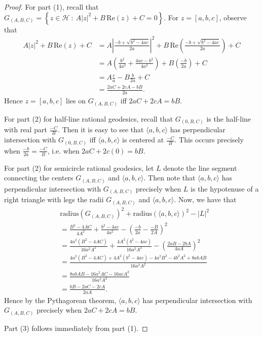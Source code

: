 \documentclass[11pt,letterpaper,reqno]{amsart}
\numberwithin{equation}{section}
\numberwithin{figure}{section}
\numberwithin{table}{section}
\newcommand{\lrp}[1]{\left(#1\right)}
\newcommand{\lrcb}[1]{\left\{#1\right\}}
\newcommand{\HH}{\mathcal{H}}
\begin{document}
\begin{proof} For part (1), recall that $G_{(A,B,C)} = \lrcb{z \in \HH ~:~ A|z|^2 + B\,\mathrm{Re}(z) + C = 0}$. For $z = [a,b,c]$, observe that
\begin{align}
    A|z|^2 + B\,\mathrm{Re}(z) + C 
    &= A\left| \frac{-b+\sqrt{b^2-4ac}}{2a}\right|^2 + B\,\mathrm{Re}\!\lrp{\frac{-b+\sqrt{b^2-4ac}}{2a}} +C \\
    &= A\lrp{ \frac{b^2}{4a^2} + \frac{4ac-b^2}{4a^2}} + B\lrp{\frac{-b}{2a}} +C \\
    &= A \frac{c}{a} - B \frac{b}{2a} + C \\
    &= \frac{2aC + 2cA - bB}{2a}.
\end{align}
Hence $z = [a,b,c]$ lies on $G_{(A,B,C)}$ iff $2aC + 2cA = bB$.

For part (2) for half-line rational geodesics, recall that $G_{(0,B,C)}$ is the half-line with real part $\frac{-C}{B}$. Then it is easy to see that $\langle a,b,c \rangle$ has perpendicular intersection with $G_{(0,B,C)}$ iff $\langle a,b,c \rangle$ is centered at $\frac{-C}{B}$. This occurs precisely when $\frac{-b}{2a} = \frac{-C}{B}$, i.e. when $2aC + 2c(0) = bB$.


For part (2) for semicircle rational geodesics, let $L$ denote the line segment connecting the centers $G_{(A,B,C)}$ and $\langle a,b,c \rangle$. Then note that $\langle a,b,c \rangle$ has perpendicular intersection with $G_{(A,B,C)}$ precisely when $L$ is the hypotenuse of a right triangle with legs the radii $G_{(A,B,C)}$ and $\langle a,b,c \rangle$. Now, we have that
\begin{align}
    &\text{radius}(G_{(A,B,C)})^2 + \text{radius}(\langle a,b,c \rangle)^2 -  |L|^2  \\
    &= \frac{B^2-4AC}{4A^2} + \frac{b^2-4ac}{4a^2} - \lrp{\frac{-b}{2a} - \frac{-B}{2A}}^2 \\
    &= \frac{4a^2 (B^2-4AC)}{16a^2A^2} + \frac{4A^2 (b^2-4ac)}{16a^2A^2} - \lrp{\frac{2aB-2bA}{4aA}}^2 \\
    &= \frac{4a^2 (B^2-4AC) + 4A^2 (b^2-4ac) - 4a^2B^2 - 4b^2A^2 + 8abAB}{16a^2A^2} \\
    &= \frac{8abAB - 16a^2AC - 16acA^2}{16a^2A^2} \\
    &= \frac{bB - 2aC - 2cA}{2aA}.
\end{align}
Hence by the Pythagorean theorem, $\langle a,b,c \rangle$ has perpendicular intersection with $G_{(A,B,C)}$ precisely when $2aC+2cA=bB$.

Part (3) follows immediately from part (1).
\end{proof}
\end{document}
